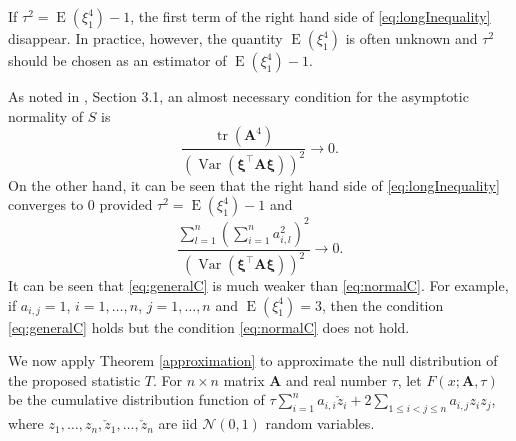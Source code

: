 \documentclass[smallextended]{svjour3}       %
\DeclareMathOperator{\mytr}{tr}
\DeclareMathOperator{\myE}{E}
\DeclareMathOperator{\myVar}{Var}
\newcommand{\BA}{\mathbf{A}}    \newcommand{\BB}{\mathbf{B}}    \newcommand{\BC}{\mathbf{C}}    \newcommand{\BD}{\mathbf{D}}    \newcommand{\BE}{\mathbf{E}}    \newcommand{\BF}{\mathbf{F}}    \newcommand{\BG}{\mathbf{G}}    \newcommand{\BH}{\mathbf{H}}    \newcommand{\BI}{\mathbf{I}}    \newcommand{\BJ}{\mathbf{J}}    \newcommand{\BK}{\mathbf{K}}    \newcommand{\BL}{\mathbf{L}}
\newcommand{\bfsym}[1]{\ensuremath{\boldsymbol{#1}}}
\def\bxi{\bfsym {\xi}}
\begin{document}
\begin{remark}\label{remark1}
    If $\tau^2=\myE (\xi_1^4) -1$, the first term of the right hand side of \eqref{eq:longInequality} disappear.
    In practice, however, the quantity $\myE (\xi_1^4)$ is often unknown and
    $\tau^2$ should be chosen as an estimator of $\myE (\xi_1^4)-1$.
\end{remark}

\begin{remark}
    As noted in \cite{Chatterjee2008}, Section 3.1, an almost necessary condition for the asymptotic normality of $S$ is
    \begin{equation}\label{eq:normalC}
        \frac{\mytr (\BA^4)}{
            \left( 
                \myVar(\bxi^\top \BA \bxi)
            \right)^2
        }\to 0. 
    \end{equation}
    On the other hand, it can be seen that the right hand side of \eqref{eq:longInequality} converges to $0$ provided $\tau^2=\myE (\xi_1^4)-1$ and
    \begin{equation}\label{eq:generalC}
            \frac{
                \sum_{l=1}^n \left( \sum_{i=1}^n a_{i,l}^2 \right)^2
            }{
            \left(
                \myVar(\bxi^\top \BA \bxi)
\right)^{2}
            }
            \to 0.
    \end{equation}
    It can be seen that \eqref{eq:generalC} is much weaker than \eqref{eq:normalC}.
    For example, if $a_{i,j}=1$, $i=1,\ldots, n$, $j=1,\ldots, n$ and $\myE (\xi_1^4)=3$, then the condition \eqref{eq:generalC} holds but the condition \eqref{eq:normalC} does not hold.
\end{remark}


We now apply Theorem \ref{approximation} to approximate the null distribution of the proposed statistic $T$.
For $n\times n$ matrix $\BA$ and real number $\tau$, let $F (x;{\BA,\tau})$ be the cumulative distribution function of $
        \tau \sum_{i=1}^n  a_{i,i}\check z_i
    +2\sum_{1\leq i <j \leq n} a_{i,j} z_i z_j
    $,
    where $z_1,\ldots, z_n, \check z_1, \ldots, \check z_n$ are iid  $\mathcal N(0,1)$ random variables.
\end{document}
